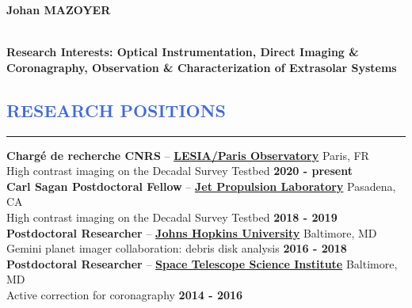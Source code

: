 \documentclass[12pt]{article}
\begin{document}
\lhead[]{}

\begin{huge}
\noindent\textbf{Johan MAZOYER}
\end{huge}\\


\textbf{Research Interests: Optical Instrumentation, Direct Imaging \& Coronagraphy, Observation \& Characterization of Extrasolar Systems}\\


\vspace{-1cm}
\textcolor{RoyalBlue}{\section{\large RESEARCH POSITIONS}
\vspace{-0.35cm}\hrule}
\vspace{0.4cm}

\textbf{Chargé de recherche CNRS} -- \href{http://www.obspm.fr/?lang=en}{\textbf{LESIA/Paris Observatory}} \hfill       { Paris, FR} \\
{\small High contrast imaging on the Decadal Survey Testbed}  \hfill  	 { \bf 2020 - present}\\


\textbf{Carl Sagan Postdoctoral Fellow} -- \href{https://www.jpl.nasa.gov/}{\textbf{Jet Propulsion Laboratory}} \hfill       { Pasadena, CA} \\
{\small High contrast imaging on the Decadal Survey Testbed}  \hfill  	 { \bf 2018 - 2019}\\


\textbf{Postdoctoral Researcher} -- \href{http://physics-astronomy.jhu.edu/}{\textbf{Johns Hopkins University}} \hfill       { Baltimore, MD} \\
{\small Gemini planet imager collaboration: debris disk analysis}  \hfill  	 { \bf 2016 - 2018}\\


\textbf{Postdoctoral Researcher} -- {\href{http://www.stsci.edu}{\textbf{Space Telescope Science Institute}}} \hfill       { Baltimore, MD} \\
{\small Active correction for coronagraphy}  \hfill  	 { \bf 2014 - 2016}\\
\end{document}
